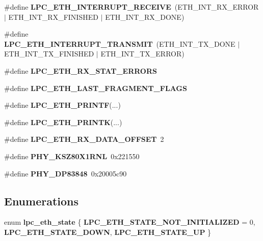 \begin{DoxyCompactItemize}
\item 
\mbox{\label{lpc-ethernet_8c_a122106fa62e8a8ca04275a7056a83620}} 
\#define {\bfseries L\+P\+C\+\_\+\+E\+T\+H\+\_\+\+I\+N\+T\+E\+R\+R\+U\+P\+T\+\_\+\+R\+E\+C\+E\+I\+VE}~(E\+T\+H\+\_\+\+I\+N\+T\+\_\+\+R\+X\+\_\+\+E\+R\+R\+OR $\vert$ E\+T\+H\+\_\+\+I\+N\+T\+\_\+\+R\+X\+\_\+\+F\+I\+N\+I\+S\+H\+ED $\vert$ E\+T\+H\+\_\+\+I\+N\+T\+\_\+\+R\+X\+\_\+\+D\+O\+NE)
\item 
\mbox{\label{lpc-ethernet_8c_ad1de1c96b19ee95fa8c3962e52f0a2cd}} 
\#define {\bfseries L\+P\+C\+\_\+\+E\+T\+H\+\_\+\+I\+N\+T\+E\+R\+R\+U\+P\+T\+\_\+\+T\+R\+A\+N\+S\+M\+IT}~(E\+T\+H\+\_\+\+I\+N\+T\+\_\+\+T\+X\+\_\+\+D\+O\+NE $\vert$ E\+T\+H\+\_\+\+I\+N\+T\+\_\+\+T\+X\+\_\+\+F\+I\+N\+I\+S\+H\+ED $\vert$ E\+T\+H\+\_\+\+I\+N\+T\+\_\+\+T\+X\+\_\+\+E\+R\+R\+OR)
\item 
\#define {\bfseries L\+P\+C\+\_\+\+E\+T\+H\+\_\+\+R\+X\+\_\+\+S\+T\+A\+T\+\_\+\+E\+R\+R\+O\+RS}
\item 
\#define {\bfseries L\+P\+C\+\_\+\+E\+T\+H\+\_\+\+L\+A\+S\+T\+\_\+\+F\+R\+A\+G\+M\+E\+N\+T\+\_\+\+F\+L\+A\+GS}
\item 
\mbox{\label{lpc-ethernet_8c_a8fb9ae7fcb62d05bc685d9e137c6f18b}} 
\#define {\bfseries L\+P\+C\+\_\+\+E\+T\+H\+\_\+\+P\+R\+I\+N\+TF}(...)
\item 
\mbox{\label{lpc-ethernet_8c_a05eef440020caf32bf7101e6c5437afd}} 
\#define {\bfseries L\+P\+C\+\_\+\+E\+T\+H\+\_\+\+P\+R\+I\+N\+TK}(...)
\item 
\mbox{\label{lpc-ethernet_8c_a847f76505177b395d959444b36d791af}} 
\#define {\bfseries L\+P\+C\+\_\+\+E\+T\+H\+\_\+\+R\+X\+\_\+\+D\+A\+T\+A\+\_\+\+O\+F\+F\+S\+ET}~2
\item 
\mbox{\label{lpc-ethernet_8c_ab94714ab09f47b637d73b9299c06f30a}} 
\#define {\bfseries P\+H\+Y\+\_\+\+K\+S\+Z80\+X1\+R\+NL}~0x221550
\item 
\mbox{\label{lpc-ethernet_8c_a4116104e091683d25b233e64e0fe15fa}} 
\#define {\bfseries P\+H\+Y\+\_\+\+D\+P83848}~0x20005c90
\end{DoxyCompactItemize}
\subsection*{Enumerations}
\begin{DoxyCompactItemize}
\item 
\mbox{\label{lpc-ethernet_8c_a1dabe0f36de27751bfeb29d1a0b691b3}} 
enum {\bfseries lpc\+\_\+eth\+\_\+state} \{ {\bfseries L\+P\+C\+\_\+\+E\+T\+H\+\_\+\+S\+T\+A\+T\+E\+\_\+\+N\+O\+T\+\_\+\+I\+N\+I\+T\+I\+A\+L\+I\+Z\+ED} = 0, 
{\bfseries L\+P\+C\+\_\+\+E\+T\+H\+\_\+\+S\+T\+A\+T\+E\+\_\+\+D\+O\+WN}, 
{\bfseries L\+P\+C\+\_\+\+E\+T\+H\+\_\+\+S\+T\+A\+T\+E\+\_\+\+UP}
 \}
\end{DoxyCompactItemize}
